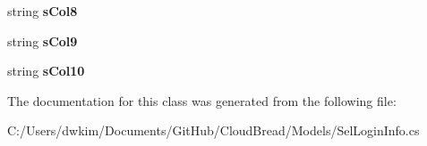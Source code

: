 \begin{DoxyCompactItemize}
\item 
string {\bfseries s\+Col8}\hypertarget{a00097_ac8650d2ccf32ca68058ec7a926d0c1dd}{}\label{a00097_ac8650d2ccf32ca68058ec7a926d0c1dd}

\item 
string {\bfseries s\+Col9}\hypertarget{a00097_a5669959338ff9bb98b4286a7d192eb1c}{}\label{a00097_a5669959338ff9bb98b4286a7d192eb1c}

\item 
string {\bfseries s\+Col10}\hypertarget{a00097_afb1ea28aca8ba7a357e3c95a6436dd14}{}\label{a00097_afb1ea28aca8ba7a357e3c95a6436dd14}

\end{DoxyCompactItemize}


The documentation for this class was generated from the following file\+:\begin{DoxyCompactItemize}
\item 
C\+:/\+Users/dwkim/\+Documents/\+Git\+Hub/\+Cloud\+Bread/\+Models/Sel\+Login\+Info.\+cs\end{DoxyCompactItemize}
